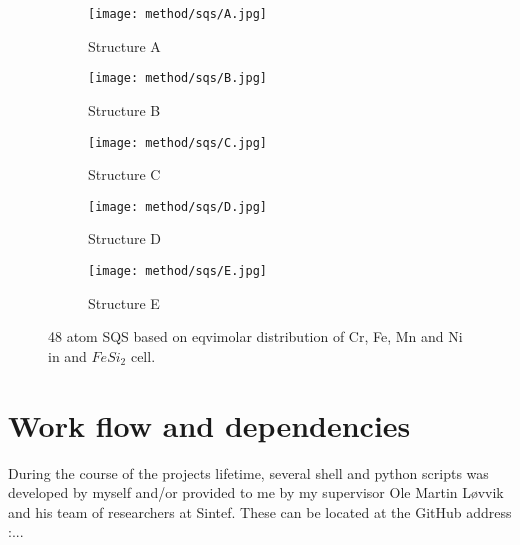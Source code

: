 \begin{figure}
\begin{subfigure}{0.5\textwidth}
\texttt{[image: method/sqs/A.jpg]}
\caption{Structure A}
\end{subfigure}
\hfill
\begin{subfigure}{0.5\textwidth}
\texttt{[image: method/sqs/B.jpg]}
\caption{Structure B}
\end{subfigure}
\begin{subfigure}{0.5\textwidth}
\texttt{[image: method/sqs/C.jpg]}
\caption{Structure C}
\end{subfigure}
\hfill
\begin{subfigure}{0.5\textwidth}
\texttt{[image: method/sqs/D.jpg]}
\caption{Structure D}
\end{subfigure}
\begin{subfigure}{0.5\textwidth}
\texttt{[image: method/sqs/E.jpg]}
\caption{Structure E}
\end{subfigure}
\caption{48 atom SQS based on eqvimolar distribution of Cr, Fe, Mn and Ni in and $FeSi_2$ cell.}
\label{sqs_FeSi2}
\end{figure}

\section{Work flow and dependencies}
During the course of the projects lifetime, several shell and python scripts was developed by myself and/or provided to me by my supervisor Ole Martin Løvvik and his team of researchers at Sintef. These can be located at the GitHub address :...